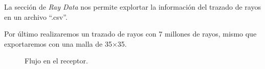 La sección de \emph{Ray Data} nos permite explortar la información del trazado de rayos en un archivo ``.csv''.

Por último realizaremos un trazado de rayos con 7 millones de rayos, mismo que exportaremos con una malla de 35$\times$35.

\begin{figure}[ht]
  \centering
  \caption{\label{fig:fluxDisco} Flujo en el receptor.}
\end{figure}



